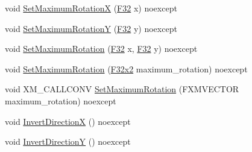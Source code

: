 \begin{DoxyCompactItemize}
\item 
void \mbox{\hyperlink{classmage_1_1script_1_1_mouse_look_script_a538d1d81ac4220a0e20e3e5de5c8e3a6}{Set\+Maximum\+RotationX}} (\mbox{\hyperlink{namespacemage_aa97e833b45f06d60a0a9c4fc22ae02c0}{F32}} x) noexcept
\item 
void \mbox{\hyperlink{classmage_1_1script_1_1_mouse_look_script_af56c4be26dde7497d53bb9f48d1b1a55}{Set\+Maximum\+RotationY}} (\mbox{\hyperlink{namespacemage_aa97e833b45f06d60a0a9c4fc22ae02c0}{F32}} y) noexcept
\item 
void \mbox{\hyperlink{classmage_1_1script_1_1_mouse_look_script_a50c3ddaad18713509394d168cddc8aa8}{Set\+Maximum\+Rotation}} (\mbox{\hyperlink{namespacemage_aa97e833b45f06d60a0a9c4fc22ae02c0}{F32}} x, \mbox{\hyperlink{namespacemage_aa97e833b45f06d60a0a9c4fc22ae02c0}{F32}} y) noexcept
\item 
void \mbox{\hyperlink{classmage_1_1script_1_1_mouse_look_script_a878f1268e16f0af89d177fd026b18253}{Set\+Maximum\+Rotation}} (\mbox{\hyperlink{namespacemage_aee4759dedc8def6c6dec26b5c7eddf29}{F32x2}} maximum\+\_\+rotation) noexcept
\item 
void X\+M\+\_\+\+C\+A\+L\+L\+C\+O\+NV \mbox{\hyperlink{classmage_1_1script_1_1_mouse_look_script_a263e143e671ef56c04132b5e58d114a9}{Set\+Maximum\+Rotation}} (F\+X\+M\+V\+E\+C\+T\+OR maximum\+\_\+rotation) noexcept
\item 
void \mbox{\hyperlink{classmage_1_1script_1_1_mouse_look_script_aa527806c78873eab652dd6337a75b89f}{Invert\+DirectionX}} () noexcept
\item 
void \mbox{\hyperlink{classmage_1_1script_1_1_mouse_look_script_a189145ae96f56b805fe2020ed75db0bc}{Invert\+DirectionY}} () noexcept
\end{DoxyCompactItemize}
